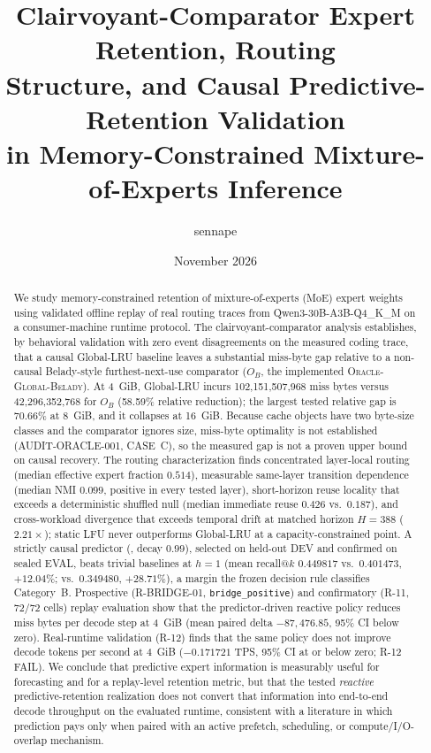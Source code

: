 \documentclass[11pt]{article}
\title{\textbf{Clairvoyant-Comparator Expert Retention, Routing\\
Structure, and Causal Predictive-Retention Validation\\
in Memory-Constrained Mixture-of-Experts Inference}}
\author{sennape}
\date{November 2026}
\newcommand{\code}[1]{\texttt{\seqsplit{#1}}}
\begin{document}
\maketitle

\begin{abstract}
We study memory-constrained retention of mixture-of-experts (MoE) expert
weights using validated offline replay of real routing traces from
Qwen3-30B-A3B-Q4\_K\_M on a consumer-machine runtime protocol. The
clairvoyant-comparator analysis establishes, by behavioral validation with
zero event disagreements on the measured coding trace, that a causal
Global-LRU baseline leaves a substantial miss-byte gap relative to a
non-causal Belady-style furthest-next-use comparator ($O_B$, the
implemented \textsc{Oracle-Global-Belady}). At 4~GiB, Global-LRU incurs
102,151,507,968 miss bytes versus 42,296,352,768 for $O_B$ (58.59\% relative
reduction); the largest tested relative gap is 70.66\% at 8~GiB, and it
collapses at 16~GiB. Because cache objects have two byte-size classes and
the comparator ignores size, miss-byte optimality is not established
(\textsc{AUDIT-ORACLE-001}, CASE~C), so the measured gap is not a proven
upper bound on causal recovery. The routing characterization finds concentrated layer-local routing (median
effective expert fraction $0.514$), measurable same-layer transition
dependence (median NMI $0.099$, positive in every tested layer), short-horizon
reuse locality that exceeds a deterministic shuffled null (median immediate
reuse $0.426$ vs.\ $0.187$), and cross-workload divergence that exceeds
temporal drift at matched horizon $H=388$ ($2.21\times$); static LFU never
outperforms Global-LRU at a capacity-constrained point. A strictly causal
predictor (\code{decayed\_transition}, decay $0.99$), selected on held-out
DEV and confirmed on sealed EVAL, beats trivial baselines at $h{=}1$ (mean
recall$@k$ $0.449817$ vs.\ $0.401473$, $+12.04\%$; vs.\ $0.349480$,
$+28.71\%$), a margin the frozen decision rule classifies Category~B.
Prospective (R-BRIDGE-01, \texttt{bridge\_positive}) and confirmatory (R-11,
$72/72$ cells) replay evaluation show that the predictor-driven reactive
policy reduces miss bytes per decode step at 4~GiB (mean paired delta
$-87{,}476.85$, 95\% CI below zero). Real-runtime validation (R-12) finds that
the same policy does not improve decode tokens per second at 4~GiB ($-0.171721$
TPS, 95\% CI at or below zero; R-12 FAIL). We conclude that
predictive expert information is measurably useful for forecasting and for a
replay-level retention metric, but that the tested \emph{reactive}
predictive-retention realization does not convert that information into
end-to-end decode throughput on the evaluated runtime, consistent with a
literature in which prediction pays only when paired with an active
prefetch, scheduling, or compute/I/O-overlap mechanism.
\end{abstract}
\end{document}
